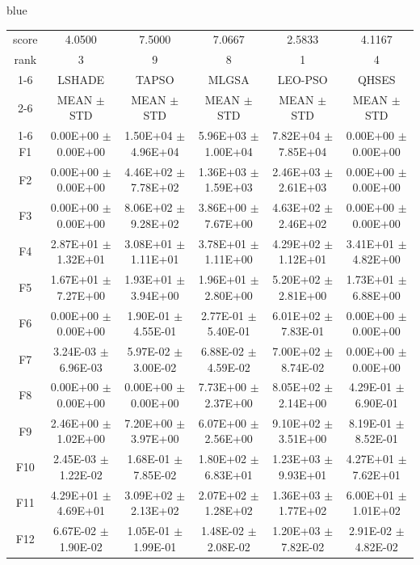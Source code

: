 \documentclass[journal, onecolumn]{IEEEtran}
\begin{document}
\begin{color}{blue}
\begin{table}[htbp!]
\begin{tabular}{c|ccccc}
			score		& 4.0500 & 7.5000 & 7.0667 & 2.5833 & 4.1167											\\													
			rank	 	& 3 & 9 & 8 & 1 & 4											\\	\cline{1-6}												
			&	LSHADE				 &	TAPSO				 &	MLGSA				 &	LEO-PSO				 &	QHSES			\\	\cline{2-6}	
			&	MEAN	$\pm$	STD		 &	MEAN	$\pm$	STD		 &	MEAN	$\pm$	STD		 &	MEAN	$\pm$	STD		 &	MEAN	$\pm$	STD	\\	\cline{1-6}
			F1	 &	0.00E+00	$\pm$	0.00E+00		 &	1.50E+04	$\pm$	4.96E+04		 &	5.96E+03	$\pm$	1.00E+04		 &	7.82E+04	$\pm$	7.85E+04		 &	0.00E+00	$\pm$	0.00E+00	\\	
			F2	 &	0.00E+00	$\pm$	0.00E+00		 &	4.46E+02	$\pm$	7.78E+02		 &	1.36E+03	$\pm$	1.59E+03		 &	2.46E+03	$\pm$	2.61E+03		 &	0.00E+00	$\pm$	0.00E+00	\\	
			F3	 &	0.00E+00	$\pm$	0.00E+00		 &	8.06E+02	$\pm$	9.28E+02		 &	3.86E+00	$\pm$	7.67E+00		 &	4.63E+02	$\pm$	2.46E+02		 &	0.00E+00	$\pm$	0.00E+00	\\	
			F4	 &	2.87E+01	$\pm$	1.32E+01		 &	3.08E+01	$\pm$	1.11E+01		 &	3.78E+01	$\pm$	1.11E+00		 &	4.29E+02	$\pm$	1.12E+01		 &	3.41E+01	$\pm$	4.82E+00	\\	
			F5	 &	1.67E+01	$\pm$	7.27E+00		 &	1.93E+01	$\pm$	3.94E+00		 &	1.96E+01	$\pm$	2.80E+00		 &	5.20E+02	$\pm$	2.81E+00		 &	1.73E+01	$\pm$	6.88E+00	\\	
			F6	 &	0.00E+00	$\pm$	0.00E+00		 &	1.90E-01	$\pm$	4.55E-01		 &	2.77E-01	$\pm$	5.40E-01		 &	6.01E+02	$\pm$	7.83E-01		 &	0.00E+00	$\pm$	0.00E+00	\\	
			F7	 &	3.24E-03	$\pm$	6.96E-03		 &	5.97E-02	$\pm$	3.00E-02		 &	6.88E-02	$\pm$	4.59E-02		 &	7.00E+02	$\pm$	8.74E-02		 &	0.00E+00	$\pm$	0.00E+00	\\	
			F8	 &	0.00E+00	$\pm$	0.00E+00		 &	0.00E+00	$\pm$	0.00E+00		 &	7.73E+00	$\pm$	2.37E+00		 &	8.05E+02	$\pm$	2.14E+00		 &	4.29E-01	$\pm$	6.90E-01	\\	
			F9	 &	2.46E+00	$\pm$	1.02E+00		 &	7.20E+00	$\pm$	3.97E+00		 &	6.07E+00	$\pm$	2.56E+00		 &	9.10E+02	$\pm$	3.51E+00		 &	8.19E-01	$\pm$	8.52E-01	\\	
			F10	 &	2.45E-03	$\pm$	1.22E-02		 &	1.68E-01	$\pm$	7.85E-02		 &	1.80E+02	$\pm$	6.83E+01		 &	1.23E+03	$\pm$	9.93E+01		 &	4.27E+01	$\pm$	7.62E+01	\\	
			F11	 &	4.29E+01	$\pm$	4.69E+01		 &	3.09E+02	$\pm$	2.13E+02		 &	2.07E+02	$\pm$	1.28E+02		 &	1.36E+03	$\pm$	1.77E+02		 &	6.00E+01	$\pm$	1.01E+02	\\	
			F12	 &	6.67E-02	$\pm$	1.90E-02		 &	1.05E-01	$\pm$	1.99E-01		 &	1.48E-02	$\pm$	2.08E-02		 &	1.20E+03	$\pm$	7.82E-02		 &	2.91E-02	$\pm$	4.82E-02	\\	

\end{tabular}
\end{table}
\end{color}
\end{document}
